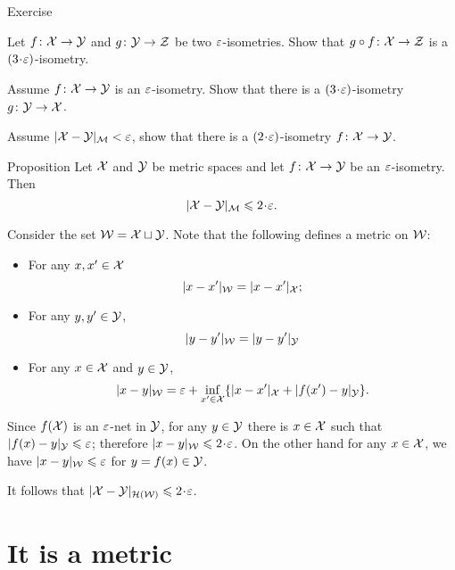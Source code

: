 \begin{thm}{Exercise}\label{ex:alm-isom:compositon}\label{ex:alm-isom:inverse}\label{ex:GH=>eps-isom}
\begin{subthm}{}
Let $f\colon\mathcal{X}\to \mathcal{Y}$ and $g\colon\mathcal{Y}\to \mathcal{Z}$ be two $\varepsilon$-isometries.
Show that $g\circ f\colon \mathcal{X}\to \mathcal{Z}$ is a $(3\cdot\eps)$-isometry.
\end{subthm}

\begin{subthm}{}
Assume $f\: \spc{X} \z\to \spc{Y}$ is an $\varepsilon$-isometry.
Show that there is a $(3\cdot\eps)$-isometry 
$g\colon \mathcal{Y}\to \mathcal{X}$.
\end{subthm}

\begin{subthm}{}
 Assume $|\mathcal{X}-\mathcal{Y}|_{\mathcal{M}}<\varepsilon$, show that there is a $(2\cdot\eps)$-isometry 
$f\colon \mathcal{X}\to \mathcal{Y}$.
\end{subthm}
\end{thm}

\begin{thm}{Proposition}\label{prop:alm-isom=>GH}
Let $\mathcal{X}$ and $\mathcal{Y}$ be metric spaces 
and let $f\colon \mathcal{X}\to \mathcal{Y}$ be an $\varepsilon$-isometry.
Then 
\[|\spc{X}-\spc{Y}|_{\spc{M}}\le 2\cdot \eps.\]
\end{thm}

 Consider the set $\mathcal{W}=\mathcal{X}\sqcup \mathcal{Y}$.
Note that the following defines a metric on $\mathcal{W}$:
\begin{itemize}
\item  For any $x,x'\in \mathcal{X}$
$$|x-x'|_{\mathcal{W}}=|x-x'|_{\mathcal{X}};$$
\item For any $y,y'\in \mathcal{Y}$,
$$|y-y'|_{\mathcal{W}}=|y-y'|_{\mathcal{Y}}$$
\item For any $x\in \mathcal{X}$ and $y\in \mathcal{Y}$,
$$|x-y|_{\mathcal{W}}=\varepsilon+\inf_{x'\in \mathcal{X}}\{|x-x'|_{\mathcal{X}}+|f(x')-y|_{\mathcal{Y}}\}.$$
\end{itemize}

Since $f(\mathcal{X})$ is an $\varepsilon$-net in $\mathcal{Y}$,
for any $y\in \mathcal{Y}$ there is $x\in \mathcal{X}$ such that $|f(x)-y|_{\spc{Y}}\z\le\eps$;
therefore $|x-y|_{\spc{W}}\le 2\cdot\eps$.
On the other hand for any $x\in \mathcal{X}$, we have $|x-y|_{\mathcal{W}}\leqslant\varepsilon$
for $y=f(x)\in \mathcal{Y}$.

It follows that $|\spc{X}-\spc{Y}|_{\mathcal{H}(\spc{W})}\le 2\cdot\eps$.
\qedsf


\section{It is a metric}

